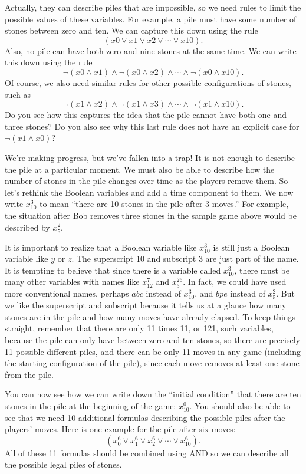 Actually, they can describe piles that are impossible, so we need rules to limit the possible values of these variables. 
For example, a pile must have some number of stones between zero and ten. We can capture this down using the rule
$$(x0 \vee x1 \vee x2 \vee \cdots \vee x10).$$
Also, no pile can have both zero and nine stones at the same time. We can write this down using the rule
$$\neg(x0 \wedge x1) \wedge \neg(x0 \wedge x2) \wedge \cdots \wedge \neg(x0 \wedge x10).$$
Of course, we also need similar rules for other possible configurations of stones, such as
$$\neg(x1 \wedge x2) \wedge \neg(x1 \wedge x3) \wedge \cdots \wedge \neg(x1 \wedge x10).$$
Do you see how this captures the idea that the pile cannot have both one and three stones? Do you also see
why this last rule does not have an explicit case for $\neg(x1 \wedge x0)$?

We're making progress, but we've fallen into a trap! It is not enough to describe the pile at a particular moment. 
We must also be able to describe how the number of stones in the pile changes over time as the players remove them.
So let's rethink the Boolean variables and add a time component to them. We now write $x_{10}^{3}$ to mean 
``there are 10 stones in the pile after 3 moves.'' For example, the situation after Bob removes three stones in the
sample game above would be described by $x_{5}^{2}$. 

It is important to realize that a Boolean variable like $x_{10}^{3}$
is still just a Boolean variable like $y$ or $z$. The superscript 10 and subscript 3 are just part of the name. It
is tempting to believe that since there is a variable called $x_{10}^{3}$, there must be many other variables with
names like $x_{12}^{7}$ and $x_{3}^{26}$. In fact, we could have used more conventional names, perhaps $abc$ instead
of $x_{10}^{3}$, and $bpe$ instead of $x_{5}^{2}$. But we like the superscript and subscript because it tells us at 
a glance how many stones are in the pile and how many moves have already elapsed. To keep things straight, remember 
that there are only 11 times 11, or 121, such variables, because the pile can only have between zero and ten stones, so there are
precisely 11 possible different piles, and there can be only 11 moves in any game (including the starting configuration 
of the pile), since each move removes at least one stone from the pile.

You can now see how we can write down the ``initial condition'' that there are ten stones in the pile at the beginning
of the game: $x_{10}^{0}$.
You should also be able to see that we need 10 additional formulas describing the possible piles 
after the players' moves. Here is one example for the pile after six moves:
$$(x_{0}^{6} \vee x_{1}^{6} \vee x_{2}^{6} \vee \cdots \vee x_{10}^{6}).$$
All of these 11 formulas should be combined using AND so we can describe all the possible legal piles of stones.

